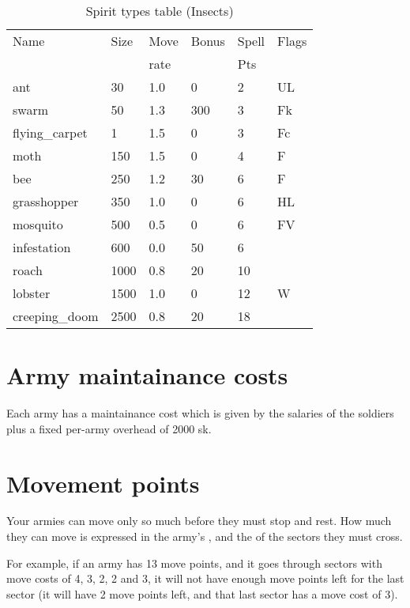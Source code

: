 \begin{same}
\begin{table}[hbpt]
\caption{Spirit types table (Insects)}
\begin{center}
\begin{tabular}{ || l | l | l | l | l | l || }
\hline
Name            & Size & Move & Bonus &Spell&Flags\\
                &      & rate &       &Pts  &\\
\hline
ant             &   30 & 1.0 &   0 &  2 &UL\\
swarm           &   50 & 1.3 & 300 &  3 &Fk\\
flying_carpet   &    1 & 1.5 &   0 &  3 &Fc\\
moth            &  150 & 1.5 &   0 &  4 &F\\
bee             &  250 & 1.2 &  30 &  6 &F\\
grasshopper     &  350 & 1.0 &   0 &  6 &HL\\
mosquito        &  500 & 0.5 &   0 &  6 &FV\\
infestation     &  600 & 0.0 &  50 &  6 &\\
roach           & 1000 & 0.8 &  20 & 10 &\\
lobster         & 1500 & 1.0 &   0 & 12 &W\\
creeping_doom   & 2500 & 0.8 &  20 & 18 &\\
\hline
\end{tabular}
\end{center}
\end{table}
\end{same}



\section{Army maintainance costs}
Each army has a maintainance cost which is given by the salaries of
the soldiers plus a fixed per-army overhead of 2000 sk.

\section{Movement points}
Your armies can move only so much before they must stop and rest.  How
much they can move is expressed in the army's , and
the  of the sectors they must cross.

For example, if an army has 13 move points, and it goes through
sectors with move costs of 4, 3, 2, 2 and 3, it will not have enough
move points left for the last sector (it will have 2 move points left,
and that last sector has a move cost of 3).

